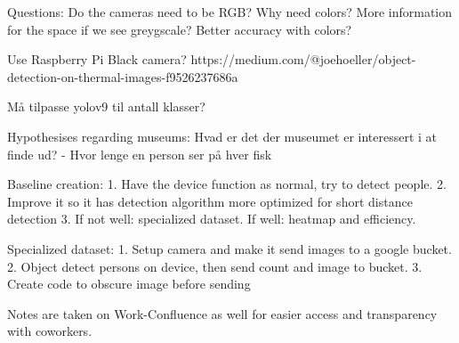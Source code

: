 Questions:
Do the cameras need to be RGB? Why need colors? More information for the space if we see greygscale? Better accuracy with colors?

Use Raspberry Pi Black camera?
https://medium.com/@joehoeller/object-detection-on-thermal-images-f9526237686a

Må tilpasse yolov9 til antall klasser?


Hypothesises regarding museums:
Hvad er det der museumet er interessert i at finde ud?
    - Hvor lenge en person ser på hver fisk




Baseline creation:
1. Have the device function as normal, try to detect people. 
2. Improve it so it has detection algorithm more optimized for short distance detection
3. If not well: specialized dataset. If well: heatmap and efficiency.

Specialized dataset:
1. Setup camera and make it send images to a google bucket. 
2. Object detect persons on device, then send count and image to bucket.
3. Create code to obscure image before sending


Notes are taken on Work-Confluence as well for easier access and transparency with coworkers. 